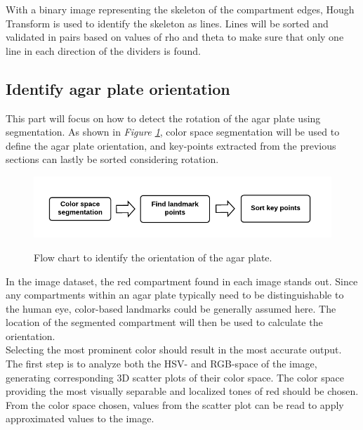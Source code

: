 \noindent With a binary image representing the skeleton of the compartment edges, Hough Transform is used to identify the skeleton as lines. Lines will be sorted and validated in pairs based on values of rho and theta to make sure that only one line in each direction of the dividers is found. \\

\subsection{Identify agar plate orientation}
This part will focus on how to detect the rotation of the agar plate using segmentation. As shown in \textit{Figure \ref{fig:orientation flowchart}}, color space segmentation will be used to define the agar plate orientation, and key-points extracted from the previous sections can lastly be sorted considering rotation.\\ 
 
 \begin{figure}[H]
     \centering
      \includegraphics[width=0.7\linewidth]{figures/PDF/Identify agar plate orientation.pdf}\\
     \caption{Flow chart to identify the orientation of the agar plate.}
     \label{fig:orientation flowchart}
 \end{figure}


\noindent In the image dataset, the red compartment found in each image stands out. Since any compartments within an agar plate typically need to be distinguishable to the human eye,  color-based landmarks could be generally assumed here. The location of the segmented compartment will then be used to calculate the orientation.\\

\noindent Selecting the most prominent color should result in the most accurate output. The first step is to analyze both the HSV- and RGB-space of the image, generating corresponding 3D scatter plots of their color space. The color space providing the most visually separable and localized tones of red should be chosen. From the color space chosen, values from the scatter plot can be read to apply approximated values to the image.\\

